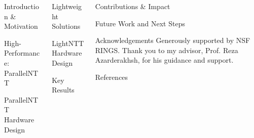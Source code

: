 \documentclass[final]{beamer}
\title{}
\author{Bardia Taghavi, Prof. Reza Azarderakhsh}
\institute[shortinst]{Florida Atlantic University}
\begin{document}
\begin{frame}[t]
\begin{columns}[t]
\separatorcolumn

\begin{column}{\colwidth}

  \begin{block}{Introduction \& Motivation}

  \end{block}
  \begin{block}{High-Performance: ParallelNTT}
  
  \end{block}
  \begin{block}{ParallelNTT Hardware Design}

  \end{block}
\end{column}

\separatorcolumn

\begin{column}{\colwidth}

  \begin{block}{Lightweight Solutions}

  \end{block}
  \begin{block}{LightNTT Hardware Design}
    
  \end{block}
  \begin{block}{Key Results}
  
  \end{block}
\end{column}

\separatorcolumn

\begin{column}{\colwidth}

  \begin{block}{Contributions \& Impact}

  \end{block}
  \begin{block}{Future Work and Next Steps}

  \end{block}
  \begin{block}{Acknowledgements}
  Generously supported by NSF RINGS. Thank you to my advisor, Prof. Reza Azarderakhsh, for his guidance and support.
  \end{block}

\begin{block}{References}
  \nocite{*}
  \footnotesize{}
\end{block}

\end{column}

\separatorcolumn
\end{columns}
\end{frame}
\end{document}
